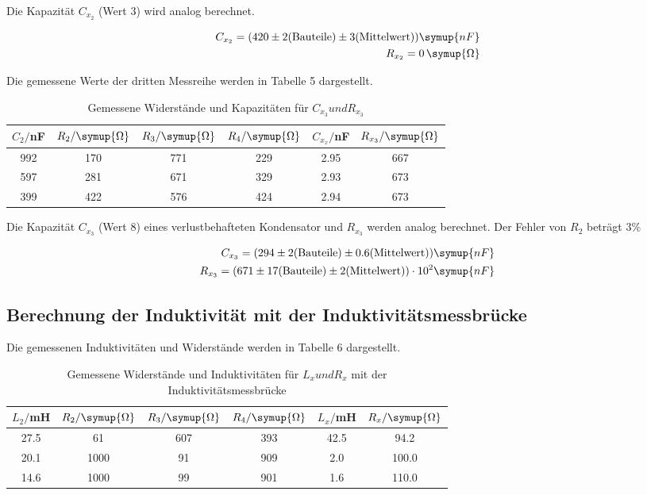 Die Kapazität $C_{x_2}$ (Wert 3) wird analog berechnet.

\begin{align*}
  C_{x_2} = (420 \pm 2 \text{(Bauteile)} \pm 3 \text{(Mittelwert)})  \symup{nF} \\
  R_{x_2} = 0 \, \symup{\Omega}
\end{align*}


Die gemessene Werte der dritten Messreihe werden in Tabelle 5 dargestellt.

\begin{table}[H]
  \centering
  \caption{Gemessene Widerstände und Kapazitäten für $C_{x_3} und R_{x_3}$}
  \label{tab:Widerstand}
  \begin{tabular}{c c c c c c}
    \toprule
    $C_2/$nF & $R_2/ \symup{\Omega}$ & $R_3/ \symup{\Omega}$ & $R_4 / \symup{\Omega}$ & $C_{x_x}/$nF & $R_{x_3}/ \symup{\Omega}$  \\
    \midrule
    992 & 170 & 771 & 229 &  2.95 & 667  \\
    597 & 281 & 671 & 329 &  2.93 & 673  \\
    399 & 422 & 576 & 424 &  2.94 & 673  \\
    \bottomrule
  \end{tabular}
\end{table}

Die Kapazität $C_{x_3}$ (Wert 8) eines verlustbehafteten Kondensator und $R_{x_3}$ werden analog berechnet.
Der Fehler von $R_2$ beträgt $3\%$

\begin{align*}
  C_{x_3} = (294 \pm 2 \text{(Bauteile)} \pm 0.6 \text{(Mittelwert)})  \symup{nF} \\
  R_{x_3} = (671 \pm 17 \text{(Bauteile)} \pm 2\text{(Mittelwert)}) \cdot 10^{2} \symup{nF}
\end{align*}



\subsection{Berechnung der Induktivität mit der Induktivitätsmessbrücke}

Die gemessenen Induktivitäten und Widerstände werden in Tabelle 6 dargestellt.

\begin{table}[H]
  \centering
  \caption{Gemessene Widerstände und Induktivitäten für $L_{x} und R_{x}$ mit der Induktivitätsmessbrücke}
  \label{tab:Widerstand}
  \begin{tabular}{c c c c c c}
    \toprule
    $L_2/$mH & $R_2/ \symup{\Omega}$ & $R_3/ \symup{\Omega}$ & $R_4 / \symup{\Omega}$ & $L_x/$mH & $R_x / \symup{\Omega}$  \\
    \midrule
    27.5 &   61 & 607 & 393 & 42.5   & 94.2 \\
    20.1 & 1000 &  91 & 909 &  2.0   & 100.0\\
    14.6 & 1000 &  99 & 901 &  1.6   & 110.0\\
    \bottomrule
  \end{tabular}
\end{table}


